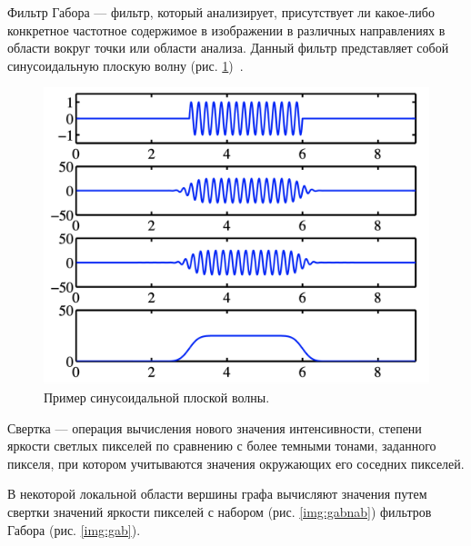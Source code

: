 Фильтр Габора --- фильтр, который анализирует, присутствует ли какое-либо конкретное частотное содержимое 
в изображении в различных направлениях в области вокруг точки или области анализа. Данный фильтр представляет собой 
синусоидальную плоскую волну (рис. \ref{img:sinuso})~\cite{gb}.
\begin{figure}[h]
    \centering
    \includegraphics[width=0.35\textheight]{img/sin.png}
    \caption{Пример синусоидальной плоской волны.}
    \label{img:sinuso}
\end{figure}

\vspace{\baselineskip}
\vspace{\baselineskip}
\vspace{\baselineskip}
\vspace{\baselineskip}
\vspace{\baselineskip}
\vspace{\baselineskip}
\vspace{\baselineskip}

Свертка --- операция вычисления нового значения интенсивности, степени яркости
светлых пикселей по сравнению с более темными тонами,
заданного пикселя, при котором учитываются значения окружающих его соседних пикселей.

В некоторой локальной области вершины графа вычисляют значения
путем свертки значений яркости пикселей с набором (рис. \ref{img:gabnab}) фильтров Габора (рис. \ref{img:gab}).

